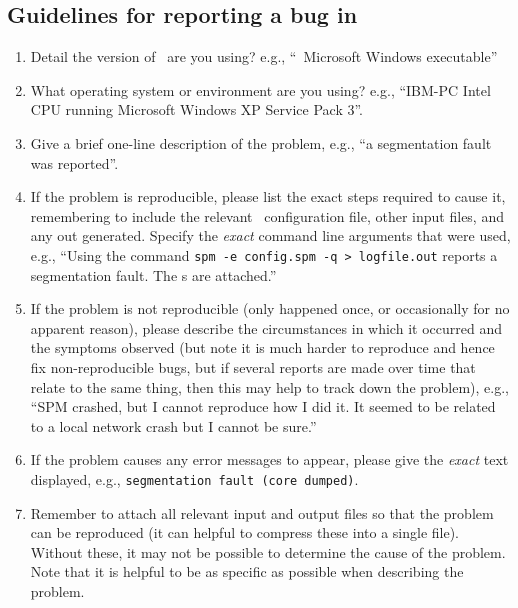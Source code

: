 \subsection{Guidelines for reporting a bug in \SPM\label{sec:error-guidelines}}

\begin{enumerate}
\item Detail the version of \SPM\ are you using? e.g., ``\SPM\ \VER Microsoft Windows executable''

\item What operating system or environment are you using? e.g., ``IBM-PC Intel CPU running Microsoft Windows XP Service Pack 3''.

\item Give a brief one-line description of the problem, e.g., ``a segmentation fault was reported''.

\item If the problem is reproducible, please list the exact steps required to cause it, remembering to include the relevant \SPM\ configuration file, other input files, and any out generated. Specify the \emph{exact} command line arguments that were used, e.g., ``Using the command \texttt{spm -e config.spm -q > logfile.out} reports a segmentation fault. The \config s are attached.''

\item If the problem is not reproducible (only happened once, or occasionally for no apparent reason), please describe the circumstances in which it occurred and the symptoms observed (but note it is much harder to reproduce and hence fix non-reproducible bugs, but if several reports are made over time that relate to the same thing, then this may help to track down the problem), e.g., ``SPM crashed, but I cannot reproduce how I did it. It seemed to be related to a local network crash but I cannot be sure.''

\item If the problem causes any error messages to appear, please give the \emph{exact} text displayed, e.g., \texttt{segmentation fault (core dumped)}.

\item Remember to attach all relevant input and output files so that the problem can be reproduced (it can helpful to compress these into a single file). Without these, it may not be possible to determine the cause of the problem. Note that it is helpful to be as specific as possible when describing the problem.

\end{enumerate}
